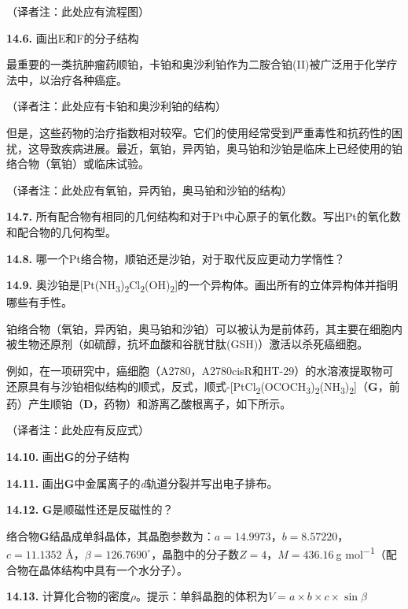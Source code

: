 （译者注：此处应有流程图）

\noindent\textbf{14.6.} 画出E和F的分子结构

最重要的一类抗肿瘤药顺铂，卡铂和奥沙利铂作为二胺合铂(II)被广泛用于化学疗法中，以治疗各种癌症。

（译者注：此处应有卡铂和奥沙利铂的结构）

但是，这些药物的治疗指数相对较窄。它们的使用经常受到严重毒性和抗药性的困扰，这导致疾病进展。最近，氧铂，异丙铂，奥马铂和沙铂是临床上已经使用的铂络合物（氧铂）或临床试验。

（译者注：此处应有氧铂，异丙铂，奥马铂和沙铂的结构）

\noindent\textbf{14.7.}
所有配合物有相同的几何结构和对于Pt中心原子的氧化数。写出Pt的氧化数和配合物的几何构型。

\noindent\textbf{14.8.} 哪一个Pt络合物，顺铂还是沙铂，对于取代反应更动力学惰性？

\noindent\textbf{14.9.}
奥沙铂是[Pt(NH\textsubscript{3})\textsubscript{2}Cl\textsubscript{2}(OH)\textsubscript{2}]的一个异构体。画出所有的立体异构体并指明哪些有手性。

铂络合物（氧铂，异丙铂，奥马铂和沙铂）可以被认为是前体药，其主要在细胞内被生物还原剂（如硫醇，抗坏血酸和谷胱甘肽(GSH)）激活以杀死癌细胞。

例如，在一项研究中，癌细胞（A2780，A2780cisR和HT-29）的水溶液提取物可还原具有与沙铂相似结构的顺式，反式，顺式-[PtCl\textsubscript{2}(OCOCH\textsubscript{3})\textsubscript{2}(NH\textsubscript{3})\textsubscript{2}]（\textbf{G}，前药）产生顺铂（\textbf{D}，药物）和游离乙酸根离子，如下所示。

（译者注：此处应有反应式）

\noindent\textbf{14.10.} 画出\textbf{G}的分子结构

\noindent\textbf{14.11.} 画出\textbf{G}中金属离子的\textit{d}轨道分裂并写出电子排布。

\noindent\textbf{14.12.} \textbf{G}是顺磁性还是反磁性的？

络合物\textbf{G}结晶成单斜晶体，其晶胞参数为：$a=14.9973$，$b=8.57220$，$c=11.1352$ \AA，$\beta=126.7690^{\circ} $，晶胞中的分子数$Z=4$，$M=436.16\ $g mol\textsuperscript{−1}（配合物在晶体结构中具有一个水分子）。

\noindent\textbf{14.13.} 计算化合物的密度$\rho$。提示：单斜晶胞的体积为$V=a\times b\times c\times \sin\beta$

